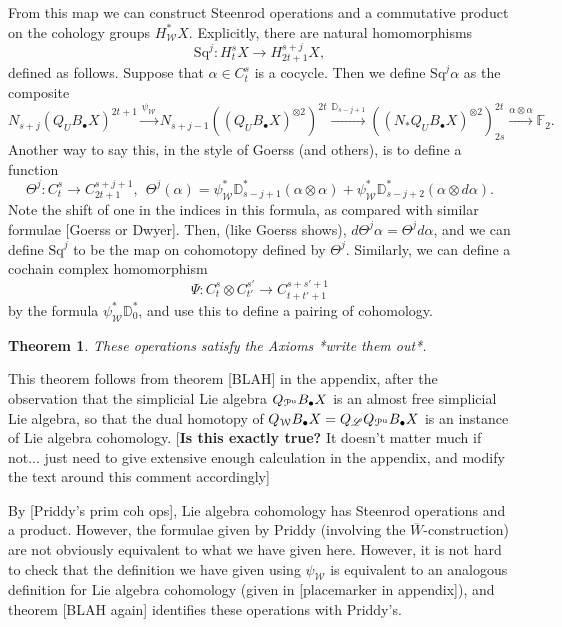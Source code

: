 \documentclass[11pt]{amsart}
\theoremstyle{plain}
\newtheorem{thm}{Theorem}[section]
\theoremstyle{definition}
\renewcommand{\to}{\longrightarrow}
\newcommand{\scrL}{\mathscr{L}}
\newcommand{\calW}{\mathcal{W}}
\newcommand{\calP}{\mathcal{P}}
\newcommand{\calV}{\mathcal{V}}
\theoremstyle{plain}
\newcommand{\PMonad}{{\calP^\textup{u}}}
\newcommand{\Palg}{{\calP}}
\newcommand{\LieOperad}{{\scrL}}
\newcommand{\vect}[2]{\calV^{#1}_{#2}}
\newcommand{\Sq}{\mathrm{Sq}}
\newcommand{\F}{\mathbb{F}}
\begin{document}
\begin{Cohomology operations for unstable Lie algebras over P}
{From this map we can construct Steenrod operations and a commutative product on the cohology groups $H^*_\calW X$. Explicitly, there are natural homomorphisms
\[\Sq^j:H_t^{s}X\to H_{2t+1}^{s+j}X,\]
defined as follows. Suppose that $\alpha\in C_t^{s}$ is a cocycle. Then we define $\Sq^j\alpha$ as the composite
\[N_{s+j}(Q_UB_{\bullet}X)^{2t+1}\overset{\psi_\calW}{\to}N_{s+j-1}((Q_UB_{\bullet}X)^{\otimes2})^{2t}\overset{\mathbb{D}_{s-j+1}}{\to}
((N_*Q_UB_{\bullet}X)^{\otimes2})^{2t}_{2s}\overset{\alpha\otimes\alpha}{\to}\F_2.
\]
Another way to say this, in the style of Goerss (and others), is to define a function
\[\Theta^j:C_{t}^{s}\to C_{2t+1}^{s+j+1},\ \ \Theta^j(\alpha)=\psi^*_\calW\mathbb{D}_{s-j+1}^*(\alpha\otimes\alpha)+ \psi^*_\calW\mathbb{D}_{s-j+2}^*(\alpha\otimes d\alpha).\]
Note the shift of one in the indices in this formula, as compared with similar formulae [Goerss or Dwyer].
Then, (like Goerss shows), $d\Theta^j\alpha=\Theta^jd\alpha$, and we can define $\Sq^j$ to be the map on cohomotopy defined by $\Theta^j$. Similarly, we can define a cochain complex homomorphism
\[\Psi:C_t^{s}\otimes C_{t'}^{s'}\to C_{t+t'+1}^{s+s'+1}\]
by the formula $\psi^*_\calW\mathbb{D}_0^*$, and use this to define a pairing of cohomology.}
\begin{thm}
These operations satisfy the Axioms *write them out*.
\end{thm}
This theorem follows from theorem [BLAH] in the appendix, after the observation that 
the simplicial Lie algebra $Q_\PMonad B_\bullet X$ is an almost free simplicial Lie algebra, so that the dual homotopy of $Q_\calW B_\bullet X=Q_{\LieOperad} Q_\PMonad B_\bullet X$ is an instance of Lie algebra cohomology. [\textbf{Is this exactly true?} It doesn't matter much if not... just need to give extensive enough calculation in the appendix, and modify the text around this comment accordingly]

By [Priddy's prim coh ops], Lie algebra cohomology has Steenrod operations and a product. However, the formulae given by Priddy (involving the $\overline{W}$-construction) are not obviously equivalent to what we have given here. However, it is not hard to check that the definition we have given using $\psi_\calW$ is equivalent to an analogous definition for Lie algebra cohomology (given in [placemarker in appendix]), and theorem [BLAH again] identifies these operations with Priddy's.


\end{Cohomology operations for unstable Lie algebras over P}
\end{document}
